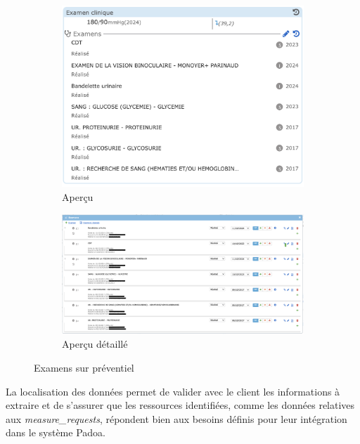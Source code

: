 \begin{figure}[h!]
  \centering
  \begin{subfigure}{0.35\textwidth} %
      \centering
      \includegraphics[width=\linewidth]{4_attachments/figures/preventiel_exam.png} %
      \caption{Aperçu}
      \label{fig:image1}
  \end{subfigure}
  \hfill
  \begin{subfigure}{0.55\textwidth}
      \centering
      \includegraphics[width=\linewidth]{4_attachments/figures/preventiel_exam_full.png} %
      \caption{Aperçu détaillé}
      \label{fig:image2}
  \end{subfigure}
  \caption{Examens sur préventiel}
  \label{fig:images}
\end{figure}
La localisation des données permet de valider avec le client les informations à extraire et de s’assurer que les ressources identifiées, comme les données relatives aux \textit{measure\_requests}, répondent bien aux besoins définis pour leur intégration dans le système Padoa.


